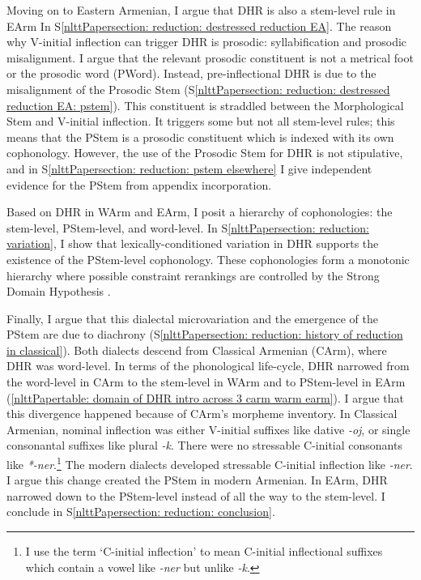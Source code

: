 Moving on to Eastern Armenian, I argue that DHR is also a stem-level rule in EArm In S\ref{nlttPapersection: reduction: destressed reduction EA}. The reason why V-initial inflection can trigger DHR is {prosodic}: syllabification and prosodic misalignment. I argue that the relevant prosodic constituent is not a metrical foot or the prosodic word (PWord). Instead, pre-inflectional DHR is due to the misalignment of the Prosodic Stem \citep{Downing-1999-ProsodicStem} (S\ref{nlttPapersection: reduction: destressed reduction EA: pstem}). This constituent is straddled between the Morphological Stem and V-initial inflection. It triggers some but not all stem-level rules; this means that the PStem is a prosodic constituent which is indexed with its own cophonology. 
However, the use of the Prosodic Stem for DHR is not stipulative, and in S\ref{nlttPapersection: reduction: pstem elsewhere} I give independent evidence for the PStem from appendix incorporation.

Based on DHR in WArm and EArm, I posit a hierarchy of cophonologies: the stem-level, PStem-level, and word-level. In S\ref{nlttPapersection: reduction: variation}, I show that lexically-conditioned variation in DHR supports the existence of the PStem-level cophonology. These cophonologies form a monotonic hierarchy where possible constraint rerankings are controlled by the Strong Domain Hypothesis \citep{Myers-1991-StructurePreservationStrongDomainHypothesis}. 




Finally, I argue that this dialectal microvariation and the emergence of the PStem are due to diachrony (S\ref{nlttPapersection: reduction: history of reduction in classical}). Both dialects descend from Classical Armenian (CArm), where DHR was word-level. In terms of the phonological life-cycle, DHR narrowed from the word-level in CArm to the stem-level in WArm and to PStem-level in EArm (\ref{nlttPapertable: domain of DHR intro across 3 carm warm earm}). I argue that this divergence happened because of CArm's morpheme inventory. In Classical Armenian, nominal inflection was either V-initial suffixes like dative \textit{-oj}, or single consonantal suffixes like plural \textit{-k}. There were no stressable C-initial consonants like \textit{*-ner}.\footnote{I use the term `C-initial inflection' to mean C-initial inflectional suffixes which contain a vowel like \textit{-ner} but unlike \textit{-k}. 
} The modern dialects developed stressable C-initial inflection like \textit{-ner}. I argue this change created the PStem in modern Armenian. In EArm, DHR narrowed down to the PStem-level instead of all the way to the stem-level. I conclude in S\ref{nlttPapersection: reduction: conclusion}. 


